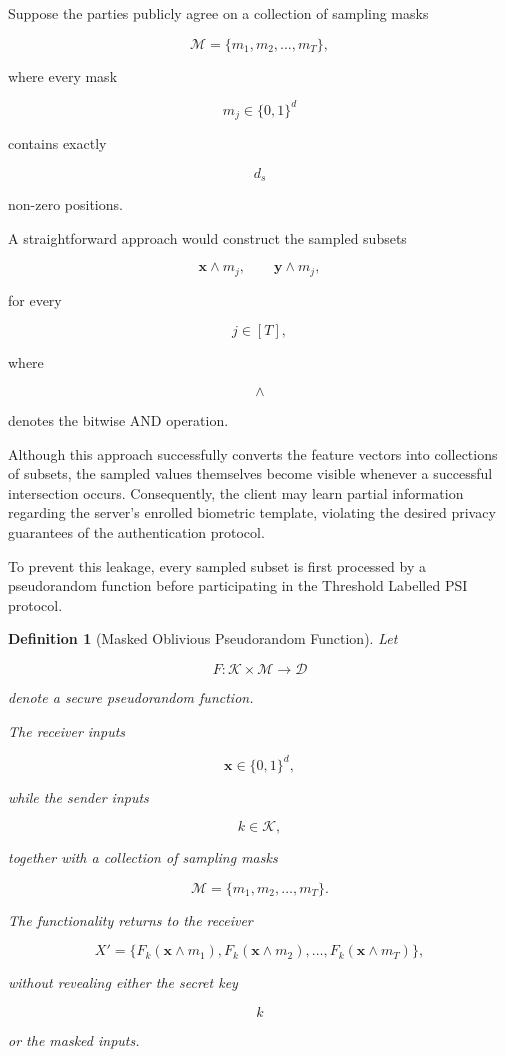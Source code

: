 \documentclass[11pt,a4paper]{article}
\newtheorem{definition}{Definition}
\begin{document}
Suppose the parties publicly agree on a collection of sampling masks

\[
\mathcal{M}
=
\{
m_1,m_2,\ldots,m_T
\},
\]

where every mask

\[
m_j
\in
\{0,1\}^{d}
\]

contains exactly

\[
d_s
\]

non-zero positions.

A straightforward approach would construct the sampled subsets

\[
\mathbf{x}\wedge m_j,
\qquad
\mathbf{y}\wedge m_j,
\]

for every

\[
j\in[T],
\]

where

\[
\wedge
\]

denotes the bitwise AND operation.

Although this approach successfully converts the feature vectors into collections of subsets, the sampled values themselves become visible whenever a successful intersection occurs. Consequently, the client may learn partial information regarding the server's enrolled biometric template, violating the desired privacy guarantees of the authentication protocol.

To prevent this leakage, every sampled subset is first processed by a pseudorandom function before participating in the Threshold Labelled PSI protocol.

\begin{definition}[Masked Oblivious Pseudorandom Function]

Let

\[
F
:
\mathcal{K}\times\mathcal{M}
\rightarrow
\mathcal{D}
\]

denote a secure pseudorandom function.

The receiver inputs

\[
\mathbf{x}
\in
\{0,1\}^{d},
\]

while the sender inputs

\[
k
\in
\mathcal{K},
\]

together with a collection of sampling masks

\[
\mathcal{M}
=
\{
m_1,m_2,\ldots,m_T
\}.
\]

The functionality returns to the receiver

\[
X'
=
\{
F_k(\mathbf{x}\wedge m_1),
F_k(\mathbf{x}\wedge m_2),
\ldots,
F_k(\mathbf{x}\wedge m_T)
\},
\]

without revealing either the secret key

\[
k
\]

or the masked inputs.

\end{definition}
\end{document}
